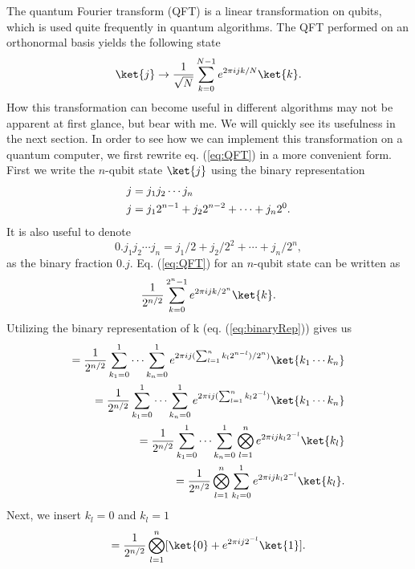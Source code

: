 The quantum Fourier transform (QFT) is a linear transformation on qubits, which is used quite frequently in quantum algorithms. The QFT performed on an orthonormal basis yields the following state \cite{NielsenAndChuang}
\begin{equation}
    \label{eq:QFT}
    \ket{j} \rightarrow \frac{1}{\sqrt{N}} \sum_{k=0}^{N-1}e^{2\pi i jk/ N}\ket{k}.
\end{equation}
How this transformation can become useful in different algorithms may not be apparent at first glance, but bear with me. We will quickly see its usefulness in the next section. In order to see how we can implement this transformation on a quantum computer, we first rewrite eq. (\ref{eq:QFT}) in a more convenient form. First we write the $n$-qubit state $\ket{j}$ using the binary representation
\begin{align}
    \label{eq:binaryRep}
    j &= j_1 j_2 \cdots j_n \notag \\
    j &= j_1 2^{n-1} + j_2 2^{n-2} + \cdots + j_n 2^0.
\end{align}
It is also useful to denote 
\begin{equation}
    \label{eq:binaryFracRep}
    0.j_1j_2 \cdots j_n = j_1/2 + j_2 /2^2 + \cdots + j_n / 2^n,
\end{equation}
as the binary fraction $0.j$.
Eq. (\ref{eq:QFT}) for an $n$-qubit state can be written as
\begin{align*}
    \frac{1}{2^{n/2}} \sum_{k=0}^{2^n - 1} e^{2\pi i jk / 2^n}\ket{k}.
\end{align*}
Utilizing the binary representation of k (eq. (\ref{eq:binaryRep})) gives us
\begin{align*}
    = \frac{1}{2^{n/2}} \sum_{k_1=0}^1 \cdots\sum_{k_n=0}^1 e^{2\pi ij (\sum_{l=1}^n k_l 2^{n-l})/2^n)}\ket{k_1\cdots k_n} \notag \\
    = \frac{1}{2^{n/2}} \sum_{k_1=0}^1 \cdots\sum_{k_n=0}^1 e^{2\pi ij (\sum_{l=1}^n k_l 2^{-l})}\ket{k_1\cdots k_n} \notag \\
    =\frac{1}{2^{n/2}} \sum_{k_1=0}^1 \cdots\sum_{k_n=0}^1 \bigotimes_{l=1}^n e^{2\pi i j k_l 2^{-l}}\ket{k_l} \notag \\
    = \frac{1}{2^{n/2}} \bigotimes_{l=1}^n \sum_{k_l = 0}^1 e^{2\pi i j k_l 2^{-l}}\ket{k_l}. \notag \\
\end{align*}
Next, we insert $k_l = 0$ and $k_l = 1$
\begin{align*}
     = \frac{1}{2^{n/2}} \bigotimes_{l=1}^n [\ket{0} + e^{2\pi i j 2^{-l}}\ket{1} ]. \notag \\
\end{align*}
